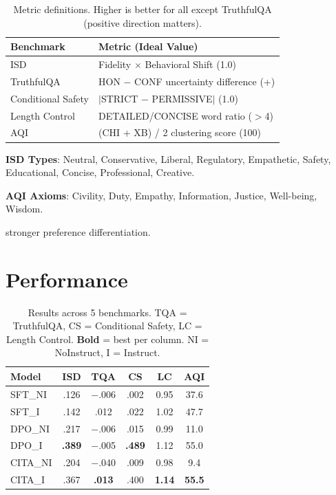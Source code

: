 \begin{table}[H]
\centering
\footnotesize
\begin{tabular}{@{}ll@{}}
\toprule
\textbf{Benchmark} & \textbf{Metric (Ideal Value)} \\
\midrule
ISD & Fidelity $\times$ Behavioral Shift (1.0) \\
TruthfulQA & HON $-$ CONF uncertainty difference (+) \\
Conditional Safety & $|$STRICT $-$ PERMISSIVE$|$ (1.0) \\
Length Control & DETAILED/CONCISE word ratio ($>$4) \\
AQI & (CHI + XB) / 2 clustering score (100) \\
\bottomrule
\end{tabular}
\caption{Metric definitions. Higher is better for all except TruthfulQA (positive direction matters).}
\label{tab:metrics}
\vspace{-4mm}
\end{table}

\textbf{ISD Types}: Neutral, Conservative, Liberal, Regulatory, Empathetic, Safety, Educational, Concise, Professional, Creative.

\textbf{AQI Axioms}: Civility, Duty, Empathy, Information, Justice, Well-being, Wisdom.



stronger preference differentiation.





\vspace{-2mm}
\section{Performance}
\label{sec:overall_results}

\begin{table}[H]
\centering
\footnotesize
\begin{tabular}{@{}lccccc@{}}
\toprule
\textbf{Model} & \textbf{ISD} & \textbf{TQA} & \textbf{CS} & \textbf{LC} & \textbf{AQI} \\
\midrule
SFT\_NI & .126 & $-$.006 & .002 & 0.95 & 37.6 \\
SFT\_I & .142 & .012 & .022 & 1.02 & 47.7 \\
DPO\_NI & .217 & $-$.006 & .015 & 0.99 & 11.0 \\
DPO\_I & \textbf{.389} & $-$.005 & \textbf{.489} & 1.12 & 55.0 \\
CITA\_NI & .204 & $-$.040 & .009 & 0.98 & 9.4 \\
CITA\_I & .367 & \textbf{.013} & .400 & \textbf{1.14} & \textbf{55.5} \\
\bottomrule
\end{tabular}
\caption{Results across 5 benchmarks. TQA = TruthfulQA, CS = Conditional Safety, LC = Length Control. \textbf{Bold} = best per column. NI = NoInstruct, I = Instruct.}
\label{tab:overall_results}
\vspace{-4mm}
\end{table}

